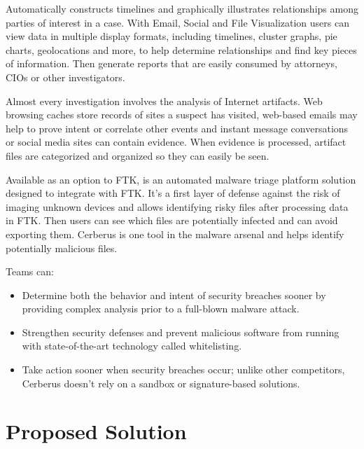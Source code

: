 Automatically constructs timelines and graphically illustrates relationships among parties of interest in a 
case. With Email, Social and File Visualization users can view data in multiple display formats, including timelines, 
cluster graphs, pie charts, geolocations and more, to help determine relationships and find key pieces 
of information. Then generate reports that are easily consumed by attorneys, CIOs or other investigators. 

Almost every investigation involves the analysis of Internet artifacts. Web browsing caches store records of sites a 
suspect has visited, web-based emails may help to prove intent or correlate other events and instant message 
conversations or social media sites can contain evidence. 
When evidence is processed, artifact files are categorized and organized so they can easily be seen. 

Available as an option to FTK,  \cite{cerberus} is an automated malware triage platform solution designed to integrate 
with FTK. It's a first layer of defense against the risk of imaging unknown devices and allows identifying 
risky files after processing data in FTK. Then users can see which files are potentially infected and can avoid 
exporting them. Cerberus is one tool in the malware arsenal and helps identify potentially malicious files.

Teams can:
\begin{itemize}
\item Determine both the behavior and intent of security breaches sooner by providing complex analysis prior 
to a full-blown malware attack. 
\item Strengthen security defenses and prevent malicious software from running with state-of-the-art technology 
called whitelisting. 
\item Take action sooner when security breaches occur; unlike other competitors, Cerberus doesn't rely on a sandbox 
or signature-based solutions. 
\end{itemize}

\section{Proposed Solution}

